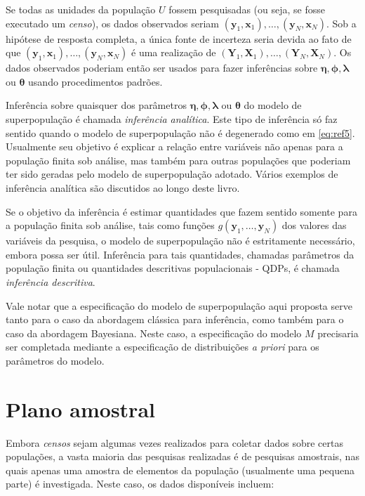 \documentclass[
  12pt,
  brazilian,
]{book}
\theoremstyle{definition}
\theoremstyle{definition}
\theoremstyle{definition}
\theoremstyle{definition}
\theoremstyle{remark}
\begin{document}
Se todas as unidades da população \(U\) fossem pesquisadas (ou seja, se fosse
executado um \emph{censo}), os dados observados seriam \((\mathbf{y}_1 , \mathbf{x}_1), \ldots, (\mathbf{y}_N , \mathbf{x}_N)\). Sob a hipótese de resposta completa, a única fonte de incerteza seria devida ao fato de que \((\mathbf{y}_1 , \mathbf{x}_1), \ldots, (\mathbf{y}_N , \mathbf{x}_N)\) é uma realização de
\(\left( \mathbf{Y}_1, \mathbf{X}_1 \right), \ldots, \left( \mathbf{Y}_N, \mathbf{X}_N \right)\). Os dados observados poderiam então ser usados para fazer inferências sobre \(\mathbf{\eta}, \mathbf{\phi},\mathbf{\lambda}\) ou \(\mathbf{\theta}\) usando procedimentos padrões.

Inferência sobre quaisquer dos parâmetros \(\mathbf{\eta}, \mathbf{\phi}, \mathbf{\lambda}\) ou \(\mathbf{\theta}\) do modelo de superpopulação é chamada \emph{inferência analítica}. Este tipo de inferência só faz sentido quando o modelo de superpopulação não é degenerado como em \eqref{eq:ref5}. Usualmente seu objetivo é explicar a relação entre variáveis não apenas para a população finita sob análise, mas também para outras populações que poderiam ter sido geradas pelo modelo de superpopulação adotado. Vários exemplos de inferência analítica são discutidos ao longo deste livro.

Se o objetivo da inferência é estimar quantidades que fazem sentido somente para
a população finita sob análise, tais como funções \(g\left( \mathbf{y}_1, \ldots, \mathbf{y}_N \right)\) dos valores das variáveis da pesquisa, o modelo de superpopulação não é estritamente necessário, embora possa ser útil. Inferência para tais quantidades, chamadas parâmetros da população finita ou quantidades descritivas populacionais - QDPs, é chamada \emph{inferência descritiva}.

Vale notar que a especificação do modelo de superpopulação aqui proposta serve
tanto para o caso da abordagem clássica para inferência, como também para o caso
da abordagem Bayesiana. Neste caso, a especificação do modelo \(M\) precisaria ser
completada mediante a especificação de distribuições \emph{a priori} para os parâmetros
do modelo.

\hypertarget{planamo}{%
\section{Plano amostral}\label{planamo}}

Embora \emph{censos} sejam algumas vezes realizados para coletar dados sobre certas
populações, a vasta maioria das pesquisas realizadas é de pesquisas amostrais,
nas quais apenas uma amostra de elementos da população (usualmente uma pequena
parte) é investigada. Neste caso, os dados disponíveis incluem:
\end{document}
